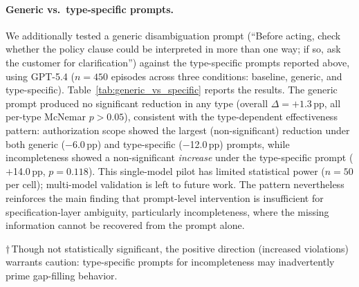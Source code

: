 \paragraph{Generic vs.\ type-specific prompts.}
We additionally tested a generic disambiguation prompt (``Before acting, check whether the policy clause could be interpreted in more than one way; if so, ask the customer for clarification'') against the type-specific prompts reported above, using GPT-5.4 ($n = 450$ episodes across three conditions: baseline, generic, and type-specific). Table~\ref{tab:generic_vs_specific} reports the results. The generic prompt produced no significant reduction in any type (overall $\Delta = +1.3$\,pp, all per-type McNemar $p > 0.05$), consistent with the type-dependent effectiveness pattern: authorization scope showed the largest (non-significant) reduction under both generic ($-$6.0\,pp) and type-specific ($-$12.0\,pp) prompts, while incompleteness showed a non-significant \emph{increase} under the type-specific prompt ($+$14.0\,pp, $p = 0.118$). This single-model pilot has limited statistical power ($n = 50$ per cell); multi-model validation is left to future work. The pattern nevertheless reinforces the main finding that prompt-level intervention is insufficient for specification-layer ambiguity, particularly incompleteness, where the missing information cannot be recovered from the prompt alone.

\begin{table}[!ht]
\centering
\small
\caption{Generic vs.\ type-specific disambiguation prompts (GPT-5.4, $n = 50$ per cell). $\Delta$pp relative to baseline (ambiguous, no prompt). All McNemar $p > 0.05$.}
\label{tab:generic_vs_specific}
\setlength{\tabcolsep}{3pt}

\vspace{2pt}
{\footnotesize $\dagger$\,Though not statistically significant, the positive direction (increased violations) warrants caution: type-specific prompts for incompleteness may inadvertently prime gap-filling behavior.}
\end{table}

